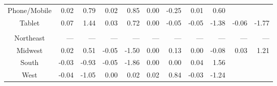 \begin{table}[t]
\begin{tabular*}{\linewidth}{@{\extracolsep{\fill}}crrrrrrrrrr}
Phone/Mobile & 0.02 & 0.79 & 0.02 & 0.85 & 0.00 & -0.25 & 0.01 & 0.60 & {\cellcolor[HTML]{rgba(125,29,103,0.7)}{\textcolor[HTML]{FFFFFF}{-0.04}}} & {\cellcolor[HTML]{rgba(125,29,103,0.7)}{\textcolor[HTML]{FFFFFF}{-2.56}}} \\ 
Tablet & 0.07 & 1.44 & 0.03 & 0.72 & 0.00 & -0.05 & -0.05 & -1.38 & -0.06 & -1.77 \\ 
\midrule\addlinespace[2.5pt]
\multicolumn{11}{l}{Region} \\[2.5pt] 
\midrule\addlinespace[2.5pt]
Northeast & --- & --- & --- & --- & --- & --- & --- & --- & --- & --- \\ 
Midwest & 0.02 & 0.51 & -0.05 & -1.50 & 0.00 & 0.13 & 0.00 & -0.08 & 0.03 & 1.21 \\ 
South & -0.03 & -0.93 & -0.05 & -1.86 & 0.00 & 0.00 & 0.04 & 1.56 & {\cellcolor[HTML]{rgba(125,29,103,0.7)}{\textcolor[HTML]{FFFFFF}{0.04}}} & {\cellcolor[HTML]{rgba(125,29,103,0.7)}{\textcolor[HTML]{FFFFFF}{2.24}}} \\ 
West & -0.04 & -1.05 & 0.00 & 0.02 & 0.02 & 0.84 & -0.03 & -1.24 & {\cellcolor[HTML]{rgba(125,29,103,0.7)}{\textcolor[HTML]{FFFFFF}{0.05}}} & {\cellcolor[HTML]{rgba(125,29,103,0.7)}{\textcolor[HTML]{FFFFFF}{1.97}}} \\ 
\bottomrule
\end{tabular*}
\end{table}

